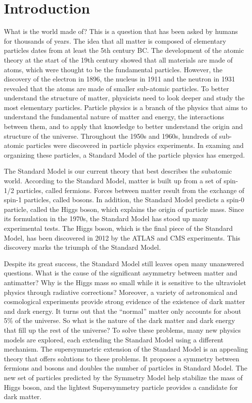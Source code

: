 \documentclass[12pt,twoside]{memoir}
\begin{document}
\chapter{Introduction}
What is the world made of? This is a question that has been asked by humans for thousands of years. 
The idea that all matter is composed of elementary particles dates from at least the 5th century BC. 
The development of the atomic theory at the start of the 19th century showed that all materials are 
made of atoms, which were thought to be the fundamental particles. However, the discovery of the electron 
in 1896, the nucleus in 1911 and the neutron in 1931 revealed that the atoms are made of smaller sub-atomic particles. 
To better understand the structure of matter, physicists need to look deeper and study the most elementary particles. 
Particle physics is a branch of the physics that aims to understand the fundamental nature of matter and energy, 
the interactions between them, and to apply that knowledge to better understand the origin and structure of the universe. 
Throughout the 1950s and 1960s, hundreds of sub-atomic particles were discovered in particle physics experiments.
In examing and organizing these particles, a Standard Model of the particle physics has emerged.

The Standard Model is our current theory that best describes the subatomic world. 
According to the Standard Model, matter is built up from a set of spin-1/2 particles, called fermions. 
Forces between matter result from the exchange of spin-1 particles, called bosons. 
In addition, the Standard Model predicts a spin-0 particle, called the Higgs boson, which explains the origin of particle mass. 
Since its formulation in the 1970s, the Standard Model has stood up many experimental tests. 
The Higgs boson, which is the final piece of the Standard Model, has been discovered in 2012 by the ATLAS and CMS experiments. 
This discovery marks the triumph of the Standard Model. 

Despite its great success, the Standard Model still leaves open many unanswered questions. 
What is the cause of the significant asymmetry between matter and antimatter? 
Why is the Higgs mass so small while it is sensitive to the ultraviolet physics through radiative corrections?
Moreover, a variety of astronomical and cosmological experiments provide strong evidence of the existence of dark matter and dark energy. 
It turns out that the ``normal'' matter only accounts for about 5\% of the universe. 
So what is the nature of the dark matter and dark energy that fill up the rest of the universe? 
To solve these problems, many new physics models are explored, each extending the Standard Model using a different mechanism. 
The supersymmetric extension of the Standard Model is an appealing theory that offers solutions to these problems.
It proposes a symmetry between fermions and bosons and doubles the number of particles in Standard Model. 
The new set of particles predicted by the Symmetry Model help stabilize the mass of Higgs boson, and the lightest Supersymmetry particle provides a candidate for dark matter. 
\end{document}
